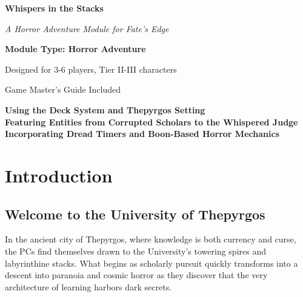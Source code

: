 \documentclass[11pt]{article}
\begin{document}
\begin{titlepage}
\centering
\vspace*{2cm}

{\Huge\bfseries\color{headercolor} Whispers in the Stacks} 

\vspace{0.5cm}

{\Large\itshape A Horror Adventure Module for Fate's Edge}

\vspace{2cm}

\vspace{2cm}

{\Large\bfseries Module Type: Horror Adventure}

\vspace{1cm}

{\large Designed for 3-6 players, Tier II-III characters}

\vspace{1cm}

{\large Game Master's Guide Included}

\vfill

{\large 
\textbf{Using the Deck System and Thepyrgos Setting} \\
\textbf{Featuring Entities from Corrupted Scholars to the Whispered Judge} \\
\textbf{Incorporating Dread Timers and Boon-Based Horror Mechanics}
}

\end{titlepage}

\newpage

\tableofcontents

\newpage

\section{Introduction}

\subsection{Welcome to the University of Thepyrgos}

In the ancient city of Thepyrgos, where knowledge is both currency and curse, the PCs find themselves drawn to the University's towering spires and labyrinthine stacks. What begins as scholarly pursuit quickly transforms into a descent into paranoia and cosmic horror as they discover that the very architecture of learning harbors dark secrets.
\end{document}
